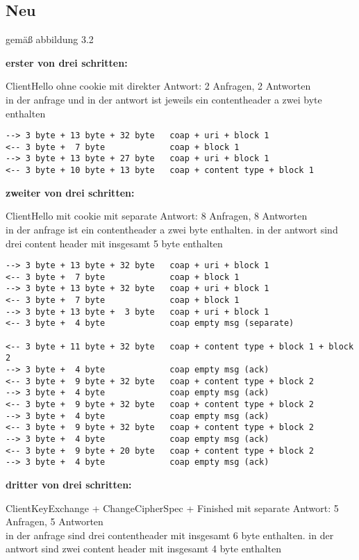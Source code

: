 \subsection{Neu}

gemäß abbildung 3.2

\textbf{erster von drei schritten:}

ClientHello ohne cookie mit direkter Antwort: 2 Anfragen, 2 Antworten\\
in der anfrage und in der antwort ist jeweils ein contentheader a zwei byte enthalten

\begin{verbatim}
--> 3 byte + 13 byte + 32 byte   coap + uri + block 1
<-- 3 byte +  7 byte             coap + block 1
--> 3 byte + 13 byte + 27 byte   coap + uri + block 1
<-- 3 byte + 10 byte + 13 byte   coap + content type + block 1
\end{verbatim}

\textbf{zweiter von drei schritten:}

ClientHello mit cookie mit separate Antwort: 8 Anfragen, 8 Antworten\\
in der anfrage ist ein contentheader a zwei byte enthalten. in der antwort sind drei content header mit insgesamt 5 byte enthalten

\begin{verbatim}
--> 3 byte + 13 byte + 32 byte   coap + uri + block 1
<-- 3 byte +  7 byte             coap + block 1
--> 3 byte + 13 byte + 32 byte   coap + uri + block 1
<-- 3 byte +  7 byte             coap + block 1
--> 3 byte + 13 byte +  3 byte   coap + uri + block 1
<-- 3 byte +  4 byte             coap empty msg (separate)

<-- 3 byte + 11 byte + 32 byte   coap + content type + block 1 + block 2
--> 3 byte +  4 byte             coap empty msg (ack)
<-- 3 byte +  9 byte + 32 byte   coap + content type + block 2
--> 3 byte +  4 byte             coap empty msg (ack)
<-- 3 byte +  9 byte + 32 byte   coap + content type + block 2
--> 3 byte +  4 byte             coap empty msg (ack)
<-- 3 byte +  9 byte + 32 byte   coap + content type + block 2
--> 3 byte +  4 byte             coap empty msg (ack)
<-- 3 byte +  9 byte + 20 byte   coap + content type + block 2
--> 3 byte +  4 byte             coap empty msg (ack)
\end{verbatim}

\textbf{dritter von drei schritten:}

ClientKeyExchange + ChangeCipherSpec + Finished mit separate Antwort: 5 Anfragen, 5 Antworten\\
in der anfrage sind drei contentheader mit insgesamt 6 byte enthalten. in der antwort sind zwei content header mit insgesamt 4 byte enthalten

